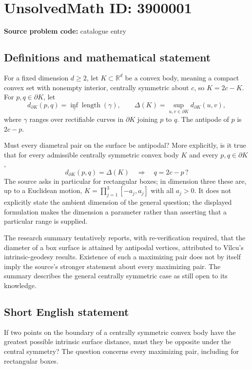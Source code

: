 \documentclass[11pt]{article}
\begin{document}
\section*{UnsolvedMath ID: 3900001}
\textbf{Source problem code:} catalogue entry
\subsection{Definitions and mathematical statement}
For a fixed dimension $d\geq2$, let $K\subset\mathbb R^d$ be a convex body, meaning a compact convex set with nonempty interior, centrally symmetric about $c$, so $K=2c-K$. For $p,q\in\partial K$, let
\[
d_{\partial K}(p,q)=\inf_\gamma\operatorname{length}(\gamma),\qquad
\Delta(K)=\sup_{u,v\in\partial K}d_{\partial K}(u,v),
\]
where $\gamma$ ranges over rectifiable curves in $\partial K$ joining $p$ to $q$. The antipode of $p$ is $2c-p$.

Must every diametral pair on the surface be antipodal? More explicitly, is it true that for every admissible centrally symmetric convex body $K$ and every $p,q\in\partial K$,
\[
d_{\partial K}(p,q)=\Delta(K)\quad\Longrightarrow\quad q=2c-p\,?
\]
The source asks in particular for rectangular boxes; in dimension three these are, up to a Euclidean motion, $K=\prod_{j=1}^3[-a_j,a_j]$ with all $a_j>0$. It does not explicitly state the ambient dimension of the general question; the displayed formulation makes the dimension a parameter rather than asserting that a particular range is supplied.

The research summary tentatively reports, with re-verification required, that the diameter of a box surface is attained by antipodal vertices, attributed to V\^ilcu's intrinsic-geodesy results. Existence of such a maximizing pair does not by itself imply the source's stronger statement about every maximizing pair. The summary describes the general centrally symmetric case as still open to its knowledge.
\subsection{Short English statement}
If two points on the boundary of a centrally symmetric convex body have the greatest possible intrinsic surface distance, must they be opposite under the central symmetry? The question concerns every maximizing pair, including for rectangular boxes.
\end{document}
